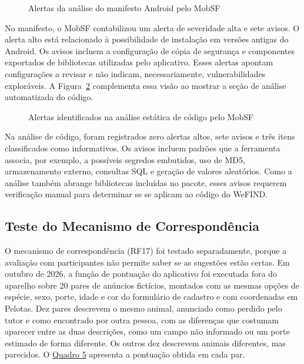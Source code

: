 \begin{figure}[H]
    \centering
    \caption{Alertas da análise do manifesto Android pelo MobSF}
    \label{fig:mobsf_manifesto}
\end{figure}

No manifesto, o MobSF contabilizou um alerta de severidade alta e sete avisos. O alerta alto está relacionado à possibilidade de instalação em versões antigas do Android. Os avisos incluem a configuração de cópia de segurança e componentes exportados de bibliotecas utilizadas pelo aplicativo. Esses alertas apontam configurações a revisar e não indicam, necessariamente, vulnerabilidades exploráveis. A Figura~\ref{fig:mobsf_codigo} complementa essa visão ao mostrar a seção de análise automatizada do código.

\begin{figure}[H]
    \centering
    \caption{Alertas identificados na análise estática de código pelo MobSF}
    \label{fig:mobsf_codigo}
\end{figure}

Na análise de código, foram registrados zero alertas altos, sete avisos e três itens classificados como informativos. Os avisos incluem padrões que a ferramenta associa, por exemplo, a possíveis segredos embutidos, uso de MD5, armazenamento externo, consultas SQL e geração de valores aleatórios. Como a análise também abrange bibliotecas incluídas no pacote, esses avisos requerem verificação manual para determinar se se aplicam ao código do WeFIND.

\subsection{Teste do Mecanismo de Correspondência}

O mecanismo de correspondência (RF17) foi testado separadamente, porque a avaliação com participantes não permite saber se as sugestões estão certas. Em outubro de 2026, a função de pontuação do aplicativo foi executada fora do aparelho sobre 20 pares de anúncios fictícios, montados com as mesmas opções de espécie, sexo, porte, idade e cor do formulário de cadastro e com coordenadas em Pelotas. Dez pares descrevem o mesmo animal, anunciado como perdido pelo tutor e como encontrado por outra pessoa, com as diferenças que costumam aparecer entre as duas descrições, como um campo não informado ou um porte estimado de forma diferente. Os outros dez descrevem animais diferentes, mas parecidos. O \hyperref[quadro:teste_correspondencia]{Quadro 5} apresenta a pontuação obtida em cada par.

